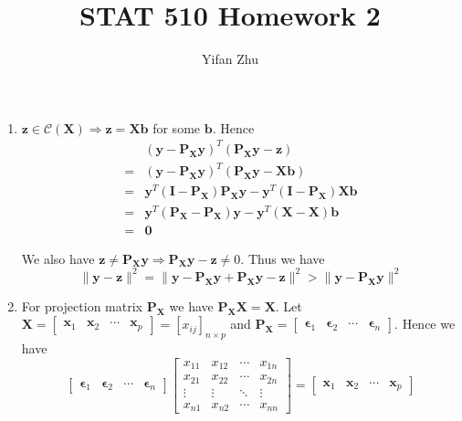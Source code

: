 \documentclass{article}
\begin{document}
	

	
	\title{STAT 510 Homework 2}
	\author{Yifan Zhu}
	\maketitle
	
	\begin{enumerate}[leftmargin = 0 em, label = \arabic*., font = \bfseries]
	\item 
	$\bm z \in \mathcal{C}(\bm X) \Rightarrow \bm z = \bm X \bm b$ for some $\bm b $. Hence
	\begin{align*}
	& (\bm y - \bm P_{\bm X} \bm y )^T (\bm P_{\bm X} \bm y - \bm z)\\
	= & (\bm y - \bm P_{\bm X} \bm y )^T (\bm P_{\bm X} \bm y - \bm X \bm b)\\
	= & \bm y^T (\bm I - \bm P_{\bm X})\bm P_{\bm X}\bm y - \bm y^T (\bm I - \bm P_{\bm X})\bm X \bm b\\
	=& \bm y^T (\bm P_{\bm X} - \bm P_{\bm X}) \bm y - \bm y^T (\bm X - \bm X)\bm b\\
	=& \bm 0
	\end{align*}

	We also have $\bm z \neq \bm P_{\bm X}\bm y \Rightarrow \bm P_{\bm X} \bm y - \bm z \neq 0$. Thus we have
	\[\|\bm y - \bm z\|^2 = \|\bm y - \bm P_{\bm X}\bm y + \bm P_{\bm X}\bm y - \bm z\|^2 > \| \bm y - \bm P_{\bm X} \bm y\|^2\]


	\item 
	For projection matrix $\bm P_{\bm X}$ we have $\bm P_{\bm X} \bm X = \bm X$. Let $\bm X = \begin{bmatrix}
		\bm x_1 & \bm x_2 & \cdots & \bm x_p
	\end{bmatrix} = [x_{ij}]_{n \times p}$ and $\bm P_{\bm X} = \begin{bmatrix}
		\bm \epsilon_{1} & \bm \epsilon_2 & \cdots & \bm \epsilon_{n}
	\end{bmatrix}$. Hence we have
	\[\begin{bmatrix}
		\bm \epsilon_{1} & \bm \epsilon_2 & \cdots & \bm \epsilon_{n}
	\end{bmatrix}  \begin{bmatrix}
		x_{11} & x_{12} & \cdots & x_{1n}\\
		x_{21} & x_{22} & \cdots & x_{2n} \\
		\vdots & \vdots & \ddots & \vdots \\
		x_{n1} & x_{n2} & \cdots & x_{nn}
	\end{bmatrix} = \begin{bmatrix}
		\bm x_1 & \bm x_2 & \cdots & \bm x_p
	\end{bmatrix}\]


\end{enumerate}
\end{document}

